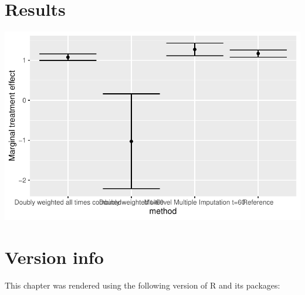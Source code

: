 \documentclass[
  letterpaper,
  DIV=11,
  numbers=noendperiod]{scrreprt}
\begin{document}
\hypertarget{results}{%
\section{Results}\label{results}}

\includegraphics{chapter_12_files/figure-pdf/unnamed-chunk-17-1.pdf}

\hypertarget{version-info-5}{%
\section*{Version info}\label{version-info-5}}


This chapter was rendered using the following version of R and its
packages:
\end{document}
